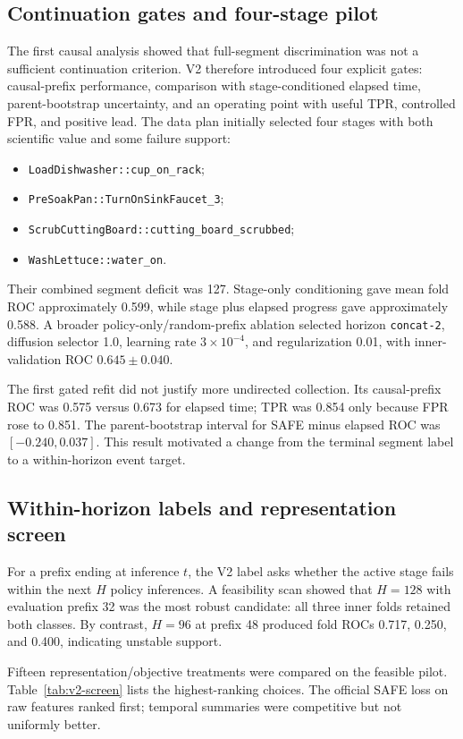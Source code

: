 \documentclass[11pt,a4paper]{article}
\newcommand{\code}[1]{\texttt{#1}}
\begin{document}
\subsection{Continuation gates and four-stage pilot}
The first causal analysis showed that full-segment discrimination was not a sufficient continuation criterion. V2 therefore introduced four explicit gates: causal-prefix performance, comparison with stage-conditioned elapsed time, parent-bootstrap uncertainty, and an operating point with useful TPR, controlled FPR, and positive lead. The data plan initially selected four stages with both scientific value and some failure support:
\begin{itemize}
\item \code{LoadDishwasher::cup\_on\_rack};
\item \code{PreSoakPan::TurnOnSinkFaucet\_3};
\item \code{ScrubCuttingBoard::cutting\_board\_scrubbed};
\item \code{WashLettuce::water\_on}.
\end{itemize}
Their combined segment deficit was 127. Stage-only conditioning gave mean fold ROC approximately 0.599, while stage plus elapsed progress gave approximately 0.588. A broader policy-only/random-prefix ablation selected horizon \code{concat-2}, diffusion selector 1.0, learning rate $3\times10^{-4}$, and regularization 0.01, with inner-validation ROC $0.645\pm0.040$.

The first gated refit did not justify more undirected collection. Its causal-prefix ROC was 0.575 versus 0.673 for elapsed time; TPR was 0.854 only because FPR rose to 0.851. The parent-bootstrap interval for SAFE minus elapsed ROC was $[-0.240,0.037]$. This result motivated a change from the terminal segment label to a within-horizon event target.

\subsection{Within-horizon labels and representation screen}
For a prefix ending at inference $t$, the V2 label asks whether the active stage fails within the next $H$ policy inferences. A feasibility scan showed that $H=128$ with evaluation prefix 32 was the most robust candidate: all three inner folds retained both classes. By contrast, $H=96$ at prefix 48 produced fold ROCs 0.717, 0.250, and 0.400, indicating unstable support.

Fifteen representation/objective treatments were compared on the feasible pilot. Table~\ref{tab:v2-screen} lists the highest-ranking choices. The official SAFE loss on raw features ranked first; temporal summaries were competitive but not uniformly better.
\end{document}
